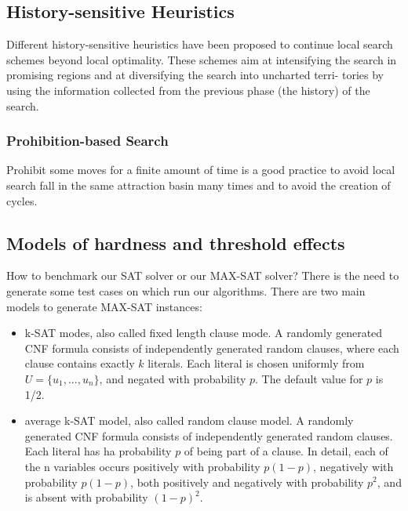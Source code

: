 \documentclass[10pt]{article}
\begin{document}
\subsection{History-sensitive Heuristics}

Different history-sensitive heuristics have been proposed to continue local search schemes beyond local optimality. These schemes aim at intensifying the search in promising regions and at diversifying the search into uncharted terri- tories by using the information collected from the previous phase (the history) of the search.

\subsubsection{Prohibition-based Search}
Prohibit some moves for a finite amount of time is a good practice to avoid local search fall in the same attraction basin many times and to avoid the creation of cycles. 

\subsection{Models of hardness and threshold effects}
How to benchmark our SAT solver or our MAX-SAT solver? There is the need to generate some test cases on which run our algorithms. There are two main models to generate MAX-SAT instances:
\begin{itemize}
\item{k-SAT modes, also called fixed length clause mode. A randomly generated CNF formula consists of independently generated random clauses, where each clause contains exactly $k$ literals. Each literal is chosen uniformly from $U = \{u_1 , ..., u_n \}$, and negated with probability $p$. The default value for $p$ is 1/2.}
\item{average k-SAT model, also called random clause model. A randomly generated CNF formula consists of independently generated random clauses. Each literal has ha probability $p$ of being part of a clause. In detail, each of the n variables occurs positively with probability $p(1 -p)$, negatively with probability $p(1 - p)$, both positively and negatively with probability $p^2$, and is absent with probability $(1 - p)^2.$}
\end{itemize}
\end{document}
